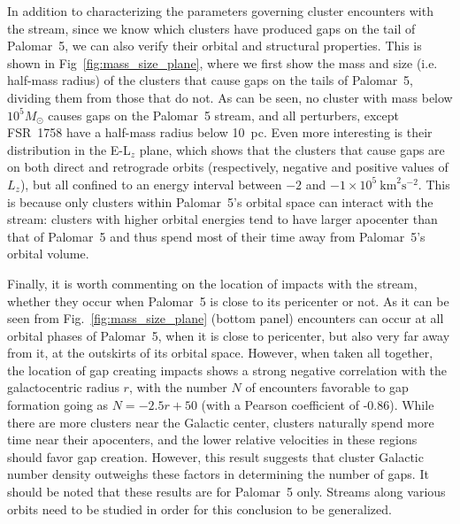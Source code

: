 \documentclass{aa}
\begin{document}
    In addition to characterizing the parameters governing cluster encounters with the stream, since we know which clusters have produced gaps on the tail of Palomar~5, we can also verify their orbital and structural properties. This is shown in Fig~\ref{fig:mass_size_plane}, where we first show the mass and size (i.e. half-mass radius) of the clusters that cause gaps on the tails of Palomar~5, dividing them from those that do not. As can be seen, no cluster with mass below $10^5 M_\odot$ causes gaps on the Palomar~5 stream, and all perturbers, except FSR~1758 have a half-mass radius below 10~pc. Even more interesting is their distribution in the E-L$_z$ plane, which shows that the clusters that cause gaps are on both direct and retrograde orbits (respectively, negative and positive values of $L_z$), but all confined to an energy interval between $-2$ and $-1 \times10^5~\textrm{km}^2\textrm{s}^{-2}$. This is because only clusters within Palomar~5's orbital space can interact with the stream: clusters with higher orbital energies tend to have larger apocenter than that of Palomar~5 and thus spend most of their time away from Palomar~5's orbital volume. 
    
    Finally, it is worth commenting on the location of impacts with the stream, whether they occur when Palomar~5 is close to its pericenter or not. As it can be seen from Fig.~\ref{fig:mass_size_plane} (bottom panel) encounters can occur at all orbital phases of Palomar~5, when it is close to pericenter, but also very far away from it, at the outskirts of its orbital space. However, when taken all together, the location of gap creating impacts shows a strong negative correlation with the galactocentric radius $r$, with the number $N$ of encounters favorable to gap formation  going as $N = -2.5r + 50$ (with a Pearson coefficient of -0.86). While there are more clusters near the Galactic center, clusters naturally spend more time near their apocenters, and the lower relative velocities in these regions should favor gap creation. However, this result suggests that cluster Galactic number density outweighs these factors in determining the number of gaps. It should be noted that these results are for Palomar~5 only. Streams along various orbits need to be studied in order for this conclusion to be generalized. 

\end{document}

